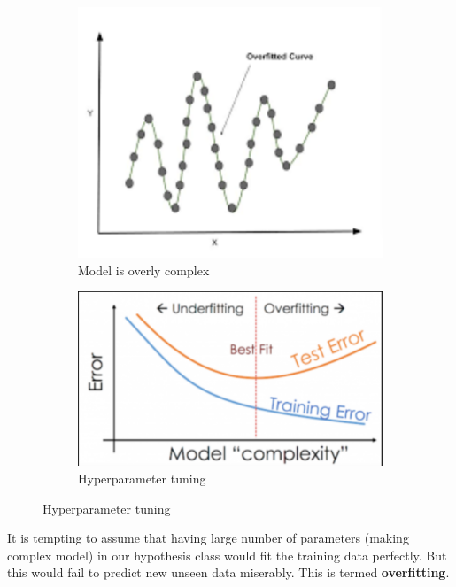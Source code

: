 \documentclass{report}
\begin{document}
\begin{figure}
  \begin{subfigure}{0.45\textwidth}
    \centering
    \includegraphics[scale=0.4]{images/05.png}
    \caption{Model is overly complex}
  \end{subfigure}
  \begin{subfigure}{0.45\textwidth}
    \centering
    \includegraphics[scale=0.4]{images/06.png}
    \caption{Hyperparameter tuning}
  \end{subfigure}
\end{figure}

It is tempting to assume that having large number of parameters (making complex model) in our hypothesis class would fit the training data perfectly. But this would fail to predict new unseen data miserably. This is termed \textbf{overfitting}.
\end{document}
